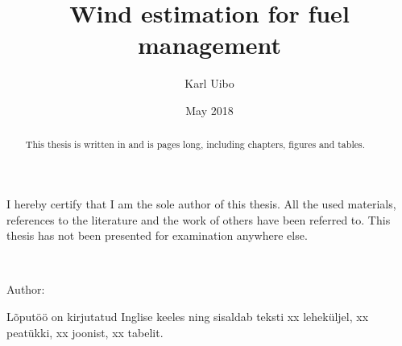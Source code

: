 \documentclass[12pt,oneside]{reedthesis}
\title{Wind estimation for fuel management}
\author{Karl Uibo}
\date{May 2018}
\theoremstyle{definition}
\theoremstyle{definition}
\theoremstyle{definition}
\theoremstyle{remark}
\begin{document}
  \maketitle

\frontmatter %
\pagestyle{empty} %
  \begin{originality}
    I hereby certify that I am the sole author of this thesis. All the used
    materials, references to the literature and the work of others have been
    referred to. This thesis has not been presented for examination anywhere
    else.
    
    ~
    
    Author:
  \end{originality}
  \begin{abstract}
    This thesis is written in and is pages long, including chapters, figures
    and tables.
  \end{abstract}
  \begin{annotatsioon}
    Lõputöö on kirjutatud Inglise keeles ning sisaldab teksti xx leheküljel,
    xx peatükki, xx joonist, xx tabelit.
  \end{annotatsioon}
\end{document}

